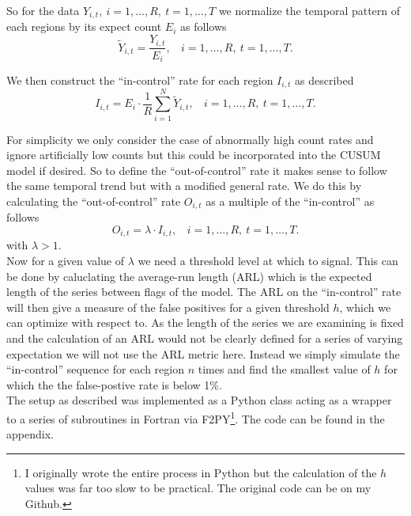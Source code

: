 \documentclass{article}
\begin{document}
So for the data $Y_{i,t}, \ i = 1, \ldots, R, \ t = 1, \ldots, T$ we normalize the temporal pattern of each regions by its expect count $E_{i}$ as follows
\begin{equation}
\tilde{Y}_{i, t} = \frac{Y_{i, t}}{E_{i}}, \ \ \ \ i = 1, \ldots, R, \ t = 1, \ldots, T.
\end{equation} 

We then construct the ``in-control'' rate for each region $I_{i, t}$ as described
\begin{equation}
I_{i, t} = E_i \cdot \frac{1}{R} \sum_{i=1}^N \tilde{Y}_{i, t}, \ \ \ \ i = 1, \ldots, R, \ t = 1, \ldots, T.
\end{equation}

For simplicity we only consider the case of abnormally high count rates and ignore artificially low counts but this could be incorporated into the CUSUM model if desired. So to define the ``out-of-control'' rate it makes sense to follow the same temporal trend but with a modified general rate. We do this by calculating the ``out-of-control'' rate $O_{i,t}$ as a multiple of the ``in-control'' as follows
\begin{equation}
O_{i,t} = \lambda \cdot I_{i,t}, \ \ \ \  i = 1, \ldots, R, \ t = 1, \ldots, T.
\end{equation} 
with $\lambda > 1$. \\

Now for a given value of $\lambda$ we need a threshold level at which to signal. This can be done by caluclating the average-run length (ARL) which is the expected length of the series between flags of the model. The ARL on the ``in-control'' rate will then give a measure of the false positives for a given threshold $h$, which we can optimize with respect to. As the length of the series we are examining is fixed and the calculation of an ARL would not be clearly defined for a series of varying expectation we will not use the ARL metric here. Instead we simply simulate the ``in-control'' sequence for each region $n$ times and find the smallest value of $h$ for which the the false-postive rate is below 1\%. \\

The setup as described was implemented as a Python class acting as a wrapper to a series of subroutines in Fortran via F2PY\footnote{I originally wrote the entire process in Python but the calculation of the $h$ values was far too slow to be practical. The original code can be on my Github.}. The code can be found in the appendix. \\
\end{document}
